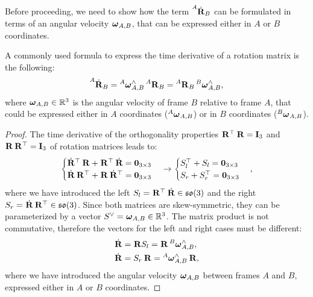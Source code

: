 Before proceeding, we need to show how the term $\rotd[A]_B$ can be formulated in terms of an angular velocity $\velang_{A,B}$, that can be expressed either in $A$ or $B$ coordinates.

\begin{definition}
\label{definition:R_dot}
%
A commonly used formula to express the time derivative of a rotation matrix is the following:
\begin{equation*}
    \rotd[A]_B = \velang[A]^\wedge_{A,B} \rot[A]_B = \rot[A]_B \velang[B]^\wedge_{A,B}
    ,
\end{equation*}
where $\velang_{A,B} \in \realn^3$ is the angular velocity of frame $B$ relative to frame $A$, that could be expressed either in $A$ coordinates ($\velang[A]_{A, B}$) or in $B$ coordinates ($\velang[B]_{A,B}$).
%
\end{definition}
%
\begin{proof}
%
The time derivative of the orthogonality properties $\rot^\top \rot = \eye_3$ and $\rot \rot^\top = \eye_3$ of rotation matrices leads to:
%
\begin{equation*}
    \begin{cases}
        \rotd^\top \rot + \rot^\top \rotd = \zeros_{3\times3} \\
        \rotd \rot^\top + \rot \rotd^\top = \zeros_{3\times3}
    \end{cases}
    \rightarrow
    \begin{cases}
        S_l^\top + S_l = \zeros_{3\times3} \\
        S_r + S_r^\top = \zeros_{3\times3}
    \end{cases}
    ,
\end{equation*}
%
where we have introduced the left $S_l = \rot^\top \rotd \in \so(3)$ and the right $S_r = \rotd \rot^\top \in \so(3)$.
Since both matrices are skew-symmetric, they can be parameterized by a vector $S^\vee = \velang_{A,B} \in \realn^3$.
The matrix product is not commutative, therefore the vectors for the left and right cases must be different:
%
\begin{align*}
    \rotd &= \rot S_l = \rot \velang[B]_{A,B}^\wedge ,\\
    \rotd &= S_r \rot = \velang[A]_{A,B}^\wedge \rot
    ,
\end{align*}
%
where we have introduced the angular velocity $\velang_{A,B}$ between frames $A$ and $B$, expressed either in $A$ or $B$ coordinates.
%
\end{proof}

